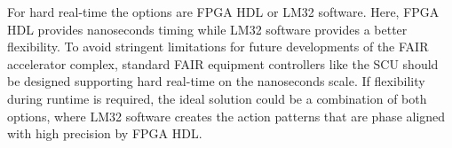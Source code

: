 \documentclass[25pt,halfparskip-,pagesize]{scrartcl}
\begin{document}
\begin{multicols*}{3}
For hard real-time the options are FPGA HDL or LM32 software. Here, FPGA
HDL provides nanoseconds timing while LM32 software provides a better
flexibility. To avoid stringent limitations for future developments of
the FAIR accelerator complex, standard FAIR equipment controllers like
the SCU should be designed supporting hard real-time on the nanoseconds
scale. If flexibility during runtime is required, the ideal solution
could be a combination of both options, where LM32 software creates the
action patterns that are phase aligned with high precision by FPGA HDL.


\vfill

\end{multicols*}
\end{document}
